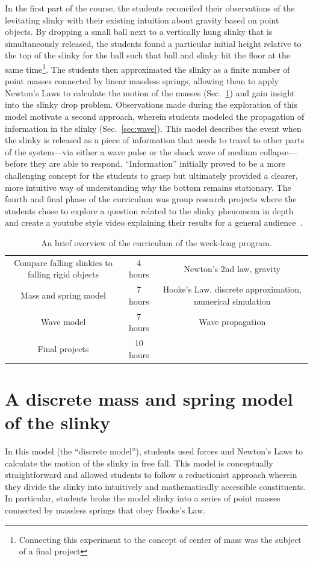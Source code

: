 \documentclass[pre,preprint,superscriptaddress,longbibliography]{revtex4-1}
\renewcommand{\sec}[1]{section~\ref{sec:#1}}
\newcommand{\fig}[1]{figure~\ref{fig:#1}}
\newcommand{\TABcurriculum}{
\begin{table}[h]\centering
\begin{tabular}{c|c|c}
Compare falling slinkies to falling rigid objects & 4 hours & Newton's 2nd law, gravity\\
Mass and spring model & 7 hours & Hooke's Law, discrete approximation, numerical simulation\\
Wave model &  7 hours & Wave propagation \\
Final projects & 10 hours &

\end{tabular}
\caption{\label{tab:curriculum} An brief overview of the curriculum of the week-long program.}
\end{table}
}
\begin{document}
In the first part of the course, the students reconciled their observations of the levitating slinky with their existing intuition about gravity based on point objects.  By dropping a small ball next to a vertically hung slinky that is simultaneously released, the students found a particular initial height relative to the top of the slinky for the ball such that ball and slinky hit the floor at the same time\footnote{Connecting this experiment to the concept of center of mass was the subject of a final project}.
The students then approximated the slinky as a finite number of point masses connected by linear massless springs, allowing them to apply  Newton's Laws to calculate the motion of the masses  (Sec.~\ref{sec:discrete})  and gain insight into the slinky drop problem.  
Observations made during the exploration of this model motivate a second approach, wherein students modeled the propagation of information in the slinky (Sec.~\ref{sec:wave}). This model describes the event when the slinky is released as a piece of information that needs to travel to other parts of the system---via either a wave pulse or the shock wave of medium collapse---before they are able to respond.  ``Information'' initially proved to be a more challenging concept for the students to grasp but ultimately provided a clearer, more intuitive way of understanding why the bottom remains stationary.  %
The fourth and final phase of the curriculum was group research projects where the students chose to explore a question related to the slinky phenomena in depth and create a youtube style video explaining their results for a general audience~\cite{compassyoutube}. 

\TABcurriculum


\section{A discrete mass and spring  model of the slinky}
\label{sec:discrete}
In this model (the ``discrete model''), students used forces and Newton's Laws to calculate the
motion of the slinky in free fall. This
model is conceptually straightforward and allowed students to follow a
reductionist approach wherein they divide the slinky into intuitively and mathematically accessible
constituents. In particular, students broke the model slinky into a series of point masses connected by massless springs that obey Hooke's Law.%
\end{document}
